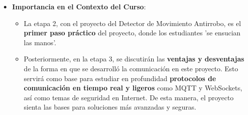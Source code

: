 \documentclass{report}
\begin{document}
\begin{itemize}
    \item \textbf{Importancia en el Contexto del Curso}:
    \begin{itemize}
        \item La etapa 2, con el proyecto del Detector de Movimiento Antirrobo, es el \textbf{primer paso práctico} del proyecto, donde los estudiantes  
        'se ensucian las manos'.
        \item Posteriormente, en la etapa 3, se discutirán las \textbf{ventajas y desventajas} de la forma en que se desarrolló la comunicación en este 
        proyecto. Esto servirá como base para estudiar en profundidad \textbf{protocolos de comunicación en tiempo real y ligeros} como MQTT y WebSockets, 
        así como temas de seguridad en Internet. De esta manera, el proyecto sienta las bases para soluciones más avanzadas y seguras.
    \end{itemize}
\end{itemize}
\end{document}
